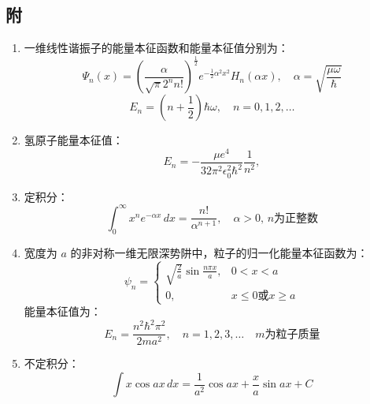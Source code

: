 \subsection{附}
\begin{enumerate}
    \item 一维线性谐振子的能量本征函数和能量本征值分别为：
    \[
    \Psi_n(x) = \left(\frac{\alpha}{\sqrt{\pi} 2^n n!}\right)^\frac{1}{2} e^{-\frac{1}{2} \alpha^2 x^2} H_n(\alpha x), \quad \alpha = \sqrt{\frac{\mu\omega}{\hbar}}~
    \]
    \[
    E_n = \left(n + \frac{1}{2}\right) \hbar \omega, \quad n = 0,1,2,\dots~
    \]
    
    \item 氢原子能量本征值：
    \[
    E_n = -\frac{\mu e^4}{32 \pi^2 \epsilon_0^2 \hbar^2} \frac{1}{n^2},~
    \]
    
    \item 定积分：
    \[
    \int_0^{\infty} x^n e^{-\alpha x} \, dx = \frac{n!}{\alpha^{n+1}}, \quad \alpha > 0, \, n \text{为正整数}~
    \]
    
    \item 宽度为 $a$ 的非对称一维无限深势阱中，粒子的归一化能量本征函数为：
    \[
    \psi_n = 
    \begin{cases} 
    \sqrt{\frac{2}{a}} \sin \frac{n\pi x}{a}, & 0 < x < a \\
    0, & x \leq 0 \text{或} x \geq a
    \end{cases}~
    \]
    能量本征值为：
    \[
    E_n = \frac{n^2 \hbar^2 \pi^2}{2ma^2}, \quad n = 1,2,3,\dots \quad m \text{为粒子质量}~
    \]
    
    \item 不定积分：
    \[
    \int x \cos ax \, dx = \frac{1}{a^2} \cos ax + \frac{x}{a} \sin ax + C~
    \]
    
\end{enumerate}